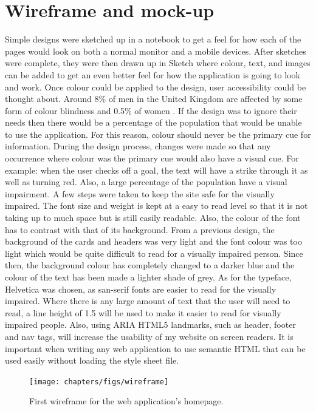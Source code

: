 \section{Wireframe and mock-up}
Simple designs were sketched up in a notebook to get a feel for how each of the pages would look on both a normal monitor and a mobile devices. After sketches were complete, they were then drawn up in Sketch \citep{sketch:2013} where colour, text, and images can be added to get an even better feel for how the application is going to look and work. Once colour could be applied to the design, user accessibility could be thought about. Around 8\% of men in the United Kingdom are affected by some form of colour blindness and 0.5\% of women \citep{colourBlind}. If the design was to ignore their needs then there would be a percentage of the population that would be unable to use the application. For this reason, colour should never be the primary cue for information. During the design process, changes were made so that any occurrence where colour was the primary cue would also have a visual cue. For example: when the user checks off a goal, the text will have a strike through it as well as turning red. Also, a large percentage of the population have a visual impairment. A few steps were taken to keep the site safe for the visually impaired. The font size and weight is kept at a easy to read level so that it is not taking up to much space but is still easily readable. Also, the colour of the font has to contrast with that of its background. From a previous design, the background of the cards and headers was very light and the font colour was too light which would be quite difficult to read for a visually impaired person. Since then, the background colour has completely changed to a darker blue and the colour of the text has been made a lighter shade of grey. As for the typeface, Helvetica was chosen, as san-serif fonts are easier to read for the visually impaired. Where there is any large amount of text that the user will need to read, a line height of 1.5 will be used to make it easier to read for visually impaired people. Also, using ARIA HTML5  landmarks, such as header, footer and nav tags, will increase the usability of my website on screen readers. It is important when writing any web application to use semantic HTML  that can be used easily without loading the style sheet file.\\

\begin{figure}[!ht]
\centering
\texttt{[image: chapters/figs/wireframe]}
\caption{First wireframe for the web application's homepage.}
\label{fig:erd}
\end{figure}

